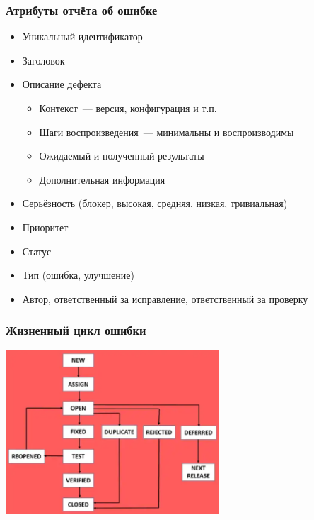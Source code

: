\documentclass{../../slides-style}
\begin{document}
    \begin{frame}
        \frametitle{Атрибуты отчёта об ошибке}
        \begin{itemize}
            \item Уникальный идентификатор
            \item Заголовок
            \item Описание дефекта
            \begin{itemize}
                \item Контекст~--- версия, конфигурация и т.п.
                \item Шаги воспроизведения~--- минимальны и воспроизводимы
                \item Ожидаемый и полученный результаты
                \item Дополнительная информация
            \end{itemize}
            \item Серьёзность (блокер, высокая, средняя, низкая, тривиальная)
            \item Приоритет
            \item Статус
            \item Тип (ошибка, улучшение)
            \item Автор, ответственный за исправление, ответственный за проверку
        \end{itemize}
    \end{frame}

    \begin{frame}
        \frametitle{Жизненный цикл ошибки}
        \begin{center}
            \includegraphics[width=0.6\textwidth]{bugLifecycle1.png}
        \end{center}
    \end{frame}
\end{document}
